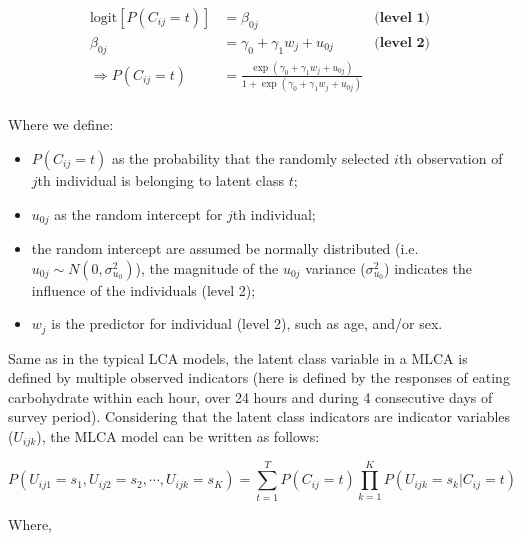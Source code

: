 \begin{equation}
\begin{aligned}
\text{logit}[P(C_{ij} = t)] & = \beta_{0j} & \textbf{(level 1)}  \\
\beta_{0j} & = \gamma_0 + \gamma_1 w_j + u_{0j} & \textbf{(level 2)} \\ 
\Rightarrow P(C_{ij} = t) & = \frac{\exp{(\gamma_0 + \gamma_1 w_j + u_{0j})}}{1 + \exp{(\gamma_0 + \gamma_1 w_j + u_{0j})}} \\
\end{aligned}
\label{randomLCA}
\end{equation}
\vspace{-0.3cm}

Where we define: 

\begin{itemize}
	\item $P(C_{ij} = t)$ as the probability that the randomly selected $i$th observation of $j$th individual is belonging to latent class $t$;
	\item $u_{0j}$ as the random intercept for $j$th individual; 
	\item the random intercept are assumed be normally distributed (i.e. $u_{0j} \sim N(0, \sigma_{u_0}^2)$), the magnitude of the $u_{0j}$ variance ($\sigma_{u_0}^2$) indicates the influence of the individuals (level 2);
	\item $w_j$ is the predictor for individual (level 2), such as age, and/or sex.
\end{itemize}


Same as in the typical LCA models, the latent class variable in a MLCA is defined by multiple observed indicators (here is defined by the responses of eating carbohydrate within each hour, over 24 hours and during 4 consecutive days of survey period). Considering that the latent class indicators are indicator variables ($U_{ijk}$), the MLCA model can be written as follows:\vspace{-0.8cm}

\begin{equation}
P(U_{ij1} = s_1, U_{ij2} = s_2, \cdots, U_{ijk} = s_{K}) = \sum_{t=1}^{T}P(C_{ij}=t)\prod_{k=1}^{K}P(U_{ijk} = s_k | C_{ij} = t)
\label{MLCA}
\end{equation}
\vspace{-0.8cm}


Where, 

